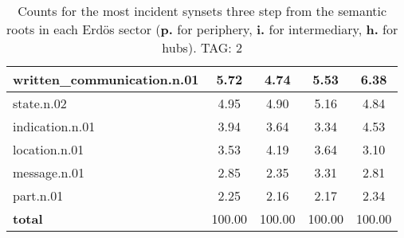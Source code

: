 \begin{table}[h!]
\begin{center}
\begin{tabular}{| l || c | c | c | c |}
written\_communication.n.01 & 5.72  & 4.74  & 5.53  & 6.38 \\\hline
state.n.02 & 4.95  & 4.90  & 5.16  & 4.84 \\\hline
indication.n.01 & 3.94  & 3.64  & 3.34  & 4.53 \\\hline
location.n.01 & 3.53  & 4.19  & 3.64  & 3.10 \\\hline
message.n.01 & 2.85  & 2.35  & 3.31  & 2.81 \\\hline
part.n.01 & 2.25  & 2.16  & 2.17  & 2.34 \\\hline\hline
{{\bf total}} & 100.00  & 100.00  & 100.00  & 100.00 \\\hline
\end{tabular}
\caption{Counts for the most incident synsets three step from the semantic roots in each Erd\"os sector ({\bf p.} for periphery, {\bf i.} for intermediary, {\bf h.} for hubs). TAG: 2}
\end{center}
\end{table}
